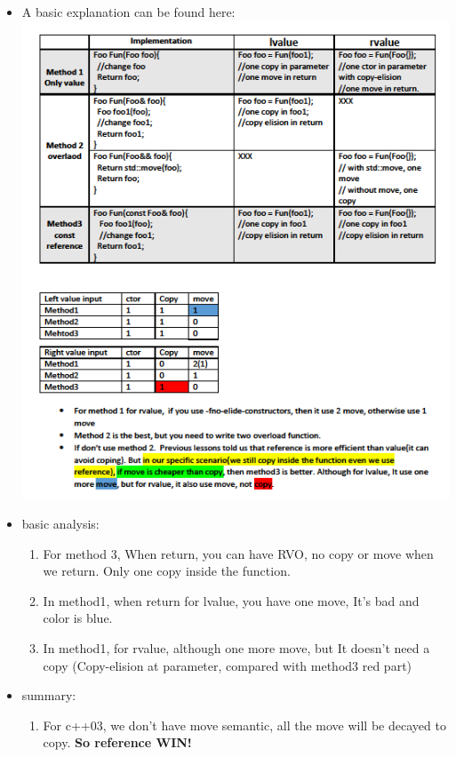 \documentclass[a4paper,11pt,twoside]{book}
\begin{document}
\begin{itemize}
\item A basic explanation can be found here: \\
\includegraphics[scale=1.0]{pics/value1.png}
\item basic analysis:
\begin{enumerate}
	
	\item For method 3, When return, you can have RVO, no copy or move when we return. Only one copy inside the function.
	
	\item In method1, when return for lvalue, you have one move, It's bad and color is blue.
	
	\item In method1, for rvalue, although one more move, but It doesn't need a copy (Copy-elision at parameter, compared with method3 red part)
\end{enumerate}

\item summary:
\begin{enumerate}
	\item For c++03, we don't have move semantic, all the move will be decayed to copy. \textbf{So reference WIN!}
	

\end{enumerate}
\end{itemize}
\end{document}
